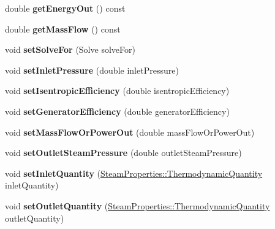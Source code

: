 \begin{DoxyCompactItemize}
\item 
\mbox{\label{class_turbine_a143fc660274e0d65ccb8fc55cc2caf83}} 
double {\bfseries get\+Energy\+Out} () const
\item 
\mbox{\label{class_turbine_a4893a203dbbf9db9ca77a0b278c4c118}} 
double {\bfseries get\+Mass\+Flow} () const
\item 
\mbox{\label{class_turbine_a96f54a8fc572dae6c5298289de890f4d}} 
void {\bfseries set\+Solve\+For} (Solve solve\+For)
\item 
\mbox{\label{class_turbine_a04996baab9a40d449a69c737c00be8e4}} 
void {\bfseries set\+Inlet\+Pressure} (double inlet\+Pressure)
\item 
\mbox{\label{class_turbine_ae67daa481ef48bcf8aef84bcccb4611d}} 
void {\bfseries set\+Isentropic\+Efficiency} (double isentropic\+Efficiency)
\item 
\mbox{\label{class_turbine_a51e9c5050a5be51b86dc23e690bd3f40}} 
void {\bfseries set\+Generator\+Efficiency} (double generator\+Efficiency)
\item 
\mbox{\label{class_turbine_a73522631e2eeefa8ea14d5b537e3e760}} 
void {\bfseries set\+Mass\+Flow\+Or\+Power\+Out} (double mass\+Flow\+Or\+Power\+Out)
\item 
\mbox{\label{class_turbine_ab9612657de02e4523492b687917b4091}} 
void {\bfseries set\+Outlet\+Steam\+Pressure} (double outlet\+Steam\+Pressure)
\item 
\mbox{\label{class_turbine_aecc05c70870fb11bbc0bb4fe5d8438bd}} 
void {\bfseries set\+Inlet\+Quantity} (\hyperlink{class_steam_properties_ae0294bedf7d178c2d8fb6aed0f62fbff}{Steam\+Properties\+::\+Thermodynamic\+Quantity} inlet\+Quantity)
\item 
\mbox{\label{class_turbine_ad5ff4ba1657aac9519a6841336ec571c}} 
void {\bfseries set\+Outlet\+Quantity} (\hyperlink{class_steam_properties_ae0294bedf7d178c2d8fb6aed0f62fbff}{Steam\+Properties\+::\+Thermodynamic\+Quantity} outlet\+Quantity)
\item 

\end{DoxyCompactItemize}
